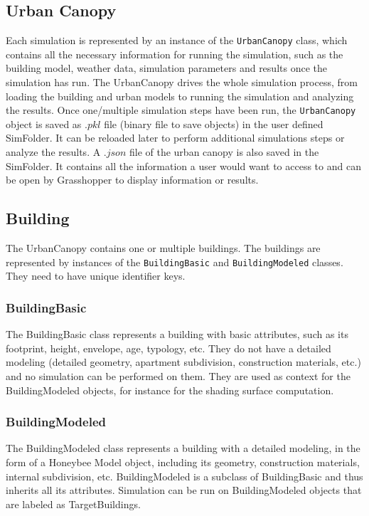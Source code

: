 \documentclass[a4paper,12pt]{article} %
\begin{document}
    \subsection{Urban Canopy}
    Each simulation is represented by an instance of the \texttt{UrbanCanopy} class, which contains all the necessary information for running the simulation, such as the building model, weather data, simulation parameters and results once the simulation has run.
    The \gls{UrbanCanopy} drives the whole simulation process, from loading the building and urban models to running the simulation and analyzing the results.
    Once one/multiple simulation steps have been run, the \texttt{UrbanCanopy} object is saved as $.pkl$ file (binary file to save objects) in the user defined \gls{SimFolder}.
    It can be reloaded later to perform additional simulations steps or analyze the results.
    A $.json$ file of the urban canopy is also saved in the \gls{SimFolder}.
    It contains all the information a user would want to access to and can be open by Grasshopper to display information or results.

    \subsection{Building}
    The \gls{UrbanCanopy} contains one or multiple buildings.
    The buildings are represented by instances of the \texttt{BuildingBasic} and \texttt{BuildingModeled} classes.
    They need to have unique identifier keys.

    \subsubsection{BuildingBasic}
    The \gls{BuildingBasic} class represents a building with basic attributes, such as its footprint, height, envelope, age, typology, etc.
    They do not have a detailed modeling (detailed geometry, apartment subdivision, construction materials, etc.) and no simulation can be performed on them.
    They are used as context for the \gls{BuildingModeled} objects, for instance for the shading surface computation.

    \subsubsection{BuildingModeled}
    The \gls{BuildingModeled} class represents a building with a detailed modeling, in the form of a Honeybee Model object, including its geometry, construction materials, internal subdivision, etc.
    \gls{BuildingModeled} is a subclass of \gls{BuildingBasic} and thus inherits all its attributes.
    Simulation can be run on \gls{BuildingModeled} objects that are labeled as \glspl{TargetBuilding}.
\end{document}
